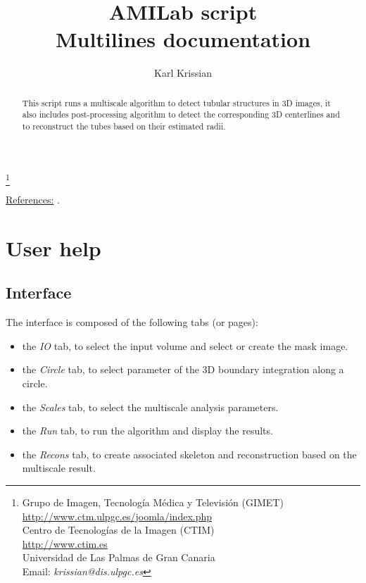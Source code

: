 \documentclass{article}
\begin{document}
\title{AMILab script \\
Multilines  documentation}
\author{ Karl Krissian
}
\thanks{Grupo de Imagen, Tecnolog\'ia M\'edica y Televisi\'on (GIMET)\\
\url{http://www.ctm.ulpgc.es/joomla/index.php}\\
Centro de Tecnolog\'ias de la Imagen (CTIM)\\
\url{http://www.ctim.es}\\
Universidad de Las Palmas de Gran Canaria\\
Email: {\it krissian@dis.ulpgc.es}
}


\maketitle


\begin{abstract}
This script runs a multiscale algorithm to detect tubular structures in 3D images, it also includes post-processing algorithm to detect the corresponding 3D centerlines and to reconstruct the tubes based on their estimated radii.
\end{abstract}

\underline{References:} \cite{Krissian2000b,Krissian_al_2003,KA09}.

\tableofchildlinks


\section{User help}

\subsection{Interface}
The interface is composed of the following tabs (or pages):
\begin{itemize}
 \item the {\em IO} tab, to select the input volume and select or create the mask image.
 \item the {\em Circle} tab, to select parameter of the 3D boundary integration along a circle.
 \item the {\em Scales} tab, to select the multiscale analysis parameters.
 \item the {\em Run} tab, to run the algorithm and display the results.
 \item the {\em Recons} tab, to create associated skeleton and reconstruction based on the multiscale result.
\end{itemize}
\end{document}
